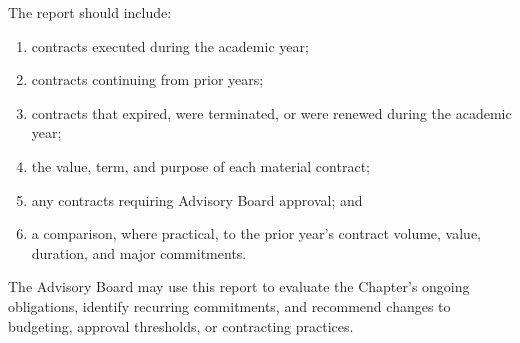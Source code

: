 The report should include:
\begin{enumerate}
    \item contracts executed during the academic year;
    \item contracts continuing from prior years;
    \item contracts that expired, were terminated, or were renewed during the academic year;
    \item the value, term, and purpose of each material contract;
    \item any contracts requiring Advisory Board approval; and
    \item a comparison, where practical, to the prior year’s contract volume, value, duration, and major commitments.
\end{enumerate}
The Advisory Board may use this report to evaluate the Chapter’s ongoing obligations, identify recurring commitments, and recommend changes to budgeting, approval thresholds, or contracting practices.